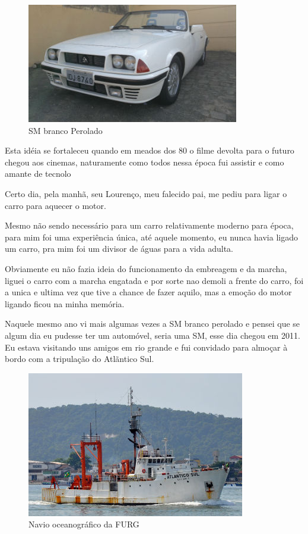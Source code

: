 \documentclass[a4paper]{report}
\begin{document}
\begin{figure}[!htb]
\centering
\includegraphics{sm_bco_per}
\caption{SM branco Perolado}
\label{sm_bco}
\end{figure}

Esta id\'eia se fortaleceu quando em meados dos 80 o filme devolta para o futuro chegou aos cinemas, naturamente como todos nessa \'epoca fui assistir e como amante de tecnolo

Certo dia, pela manh\~a, seu Louren\c{c}o, meu falecido pai, me pediu para ligar o carro para aquecer o motor.

Mesmo n\~ao sendo necess\'ario para um carro relativamente moderno para \'epoca, para mim foi uma experi\^encia \'unica,
at\'e aquele momento, eu nunca havia ligado um carro, pra mim foi um divisor de \'aguas para a vida adulta.

Obviamente eu n\~ao fazia ideia do funcionamento da embreagem e da marcha, liguei o carro com a marcha engatada e por sorte
nao demoli a frente do carro, foi a unica e ultima vez que tive a chance de fazer aquilo, mas a emo\c{c}\~ao do motor ligando ficou
na minha mem\'oria. 

Naquele mesmo ano vi mais algumas vezes a SM branco perolado e pensei que se algum dia eu pudesse ter um
autom\'ovel, seria uma SM, esse dia chegou em 2011.
\clearpage
Eu estava visitando uns amigos em rio grande e fui convidado para almo\c{c}ar \`a bordo com a tripula\c{c}\~ao do Atl\~antico Sul.

\begin{figure}[!htb]
\centering
\includegraphics{atsul}
\caption{Navio oceanogr\'afico da FURG}
\label{at_sul}
\end{figure}
\end{document}
